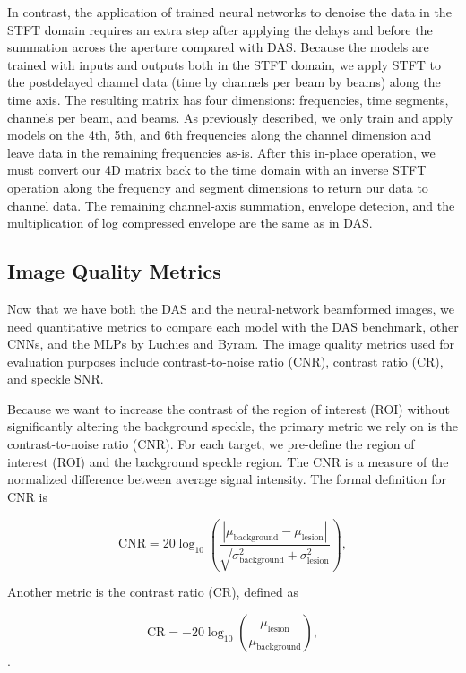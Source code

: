 In contrast, the application of trained neural networks to denoise the data in the STFT domain requires an extra step after applying the delays and before the summation across the aperture compared with DAS. Because the models are trained with inputs and outputs both in the STFT domain, we apply STFT to the postdelayed channel data (time by channels per beam by beams) along the time axis. The resulting matrix has four dimensions: frequencies, time segments, channels per beam, and beams. As previously described, we only train and apply models on the 4th, 5th, and 6th frequencies along the channel dimension and leave data in the remaining frequencies as-is. After this in-place operation, we must convert our 4D matrix back to the time domain with an inverse STFT operation along the frequency and segment dimensions to return our data to channel data. The remaining channel-axis summation, envelope detecion, and the multiplication of log compressed envelope are the same as in DAS.


\subsection{Image Quality Metrics}

Now that we have both the DAS and the neural-network beamformed images, we need quantitative metrics to compare each model with the DAS benchmark, other CNNs, and the MLPs by Luchies and Byram. The image quality metrics used for evaluation purposes include contrast-to-noise ratio (CNR), contrast ratio (CR), and speckle SNR.

Because we want to increase the contrast of the region of interest (ROI) without significantly altering the background speckle, the primary metric we rely on is the contrast-to-noise ratio (CNR). For each target, we pre-define the region of interest (ROI) and the background speckle region. The CNR is a measure of the normalized difference between average signal intensity. The formal definition for CNR is


\begin{equation*}
  \textrm {CNR} = 20 \log _{10} \left ({\frac {|\mu _{\text {background}} - \mu _{\text {lesion}}|}{\sqrt {\sigma ^{2}_{\text {background}} + \sigma ^{2}_{\text {lesion}}}} }\right),\tag{4}
\end{equation*}

Another metric is the contrast ratio (CR), defined as

\begin{equation*}
  \textrm {CR} = -20 \log _{10} \left ({\frac {\mu _{\text {lesion}}}{\mu _{\text {background}}} }\right),\tag{3}
\end{equation*}.


